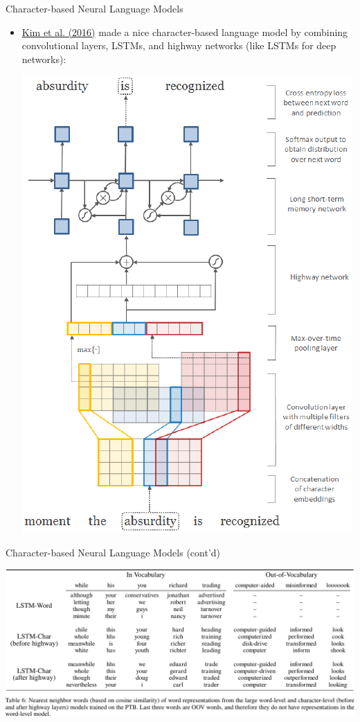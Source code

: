 \documentclass[xcolor=pdftex,x11names,table,hyperref]{beamer}
\newcommand{\conv}{convolutional}
\begin{document}
\begin{frame}{Character-based Neural Language Models}
\begin{itemize}
	\item \href{http://arxiv.org/abs/1508.06615}{Kim et al. (2016)} made a nice character-based language model by combining \conv{} layers, LSTMs, and highway networks (like LSTMs for deep networks): \\
	\begin{center}
	\includegraphics[height=0.73\textheight]{images/kim-etal2016_fig1.pdf}
	\end{center}
\end{itemize}
\end{frame}

\begin{frame}{Character-based Neural Language Models (cont'd)}
	\begin{center}
	\includegraphics[width=1.02\textwidth]{images/kim-etal2016_table6.pdf}
	\end{center}
\end{frame}
\end{document}
